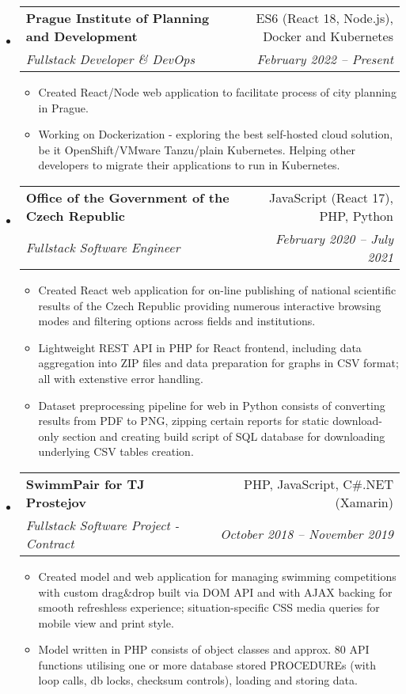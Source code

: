 \documentclass[letterpaper,11pt]{article}
\makeatletter
\newcommand{\sitem}[1]{\item #1 \vspace{-2pt}}
\newcommand{\resumeSubheading}[4]{
  \vspace{-1pt}\item
    \begin{tabular*}{0.97\textwidth}[t]{l@{\extracolsep{\fill}}r}
      \textbf{#1} & #2 \\
      \textit{\small#3} & \textit{\small #4} \\
    \end{tabular*}\vspace{-5pt}
}
\newenvironment{subheadingListing}{\begin{itemize}[leftmargin=*]}{\end{itemize}}
\newenvironment{resumeList}{\begin{itemize}}{\end{itemize}\vspace{-5pt}}
\makeatother
\begin{document}
\begin{subheadingListing}

  \resumeSubheading
  {Prague Institute of Planning and Development}{ES6 (React 18, Node.js), Docker and Kubernetes}
  {Fullstack Developer \& DevOps}{February 2022 – Present}
  \begin{resumeList}
    \sitem{Created React/Node web application to facilitate process of city planning in Prague.}
     \sitem{Working on Dockerization - exploring the best self-hosted cloud solution, be it OpenShift/VMware Tanzu/plain Kubernetes. Helping other developers to migrate their applications to run in Kubernetes.}
  \end{resumeList}

  \resumeSubheading
  {Office of the Government of the Czech Republic}{JavaScript (React 17), PHP, Python}
  {Fullstack Software Engineer}{February 2020 – July 2021}
  \begin{resumeList}
    \sitem{Created React web application for on-line publishing of national scientific results of the Czech Republic providing numerous interactive browsing modes and filtering options across fields and institutions.}
    \sitem{Lightweight REST API in PHP for React frontend, including data aggregation into ZIP files and data preparation for graphs in CSV format; all with extenstive error handling.}
    \sitem{Dataset preprocessing pipeline for web in Python consists of converting results from PDF to PNG, zipping certain reports for static download-only section and creating build script of SQL database for downloading underlying CSV tables creation.}
  \end{resumeList}

  \resumeSubheading
  {SwimmPair for TJ Prostejov}{PHP, JavaScript, C\#.NET (Xamarin)}
  {Fullstack Software Project - Contract}{October 2018 – November 2019}
  \begin{resumeList}
    \sitem{Created model and web application for managing swimming competitions with custom drag\&drop built via DOM API and with AJAX backing for smooth refreshless experience; situation-specific CSS media queries for mobile view and print style.}
    \sitem{Model written in PHP consists of object classes and approx. 80 API functions utilising one or more database stored PROCEDUREs (with loop calls, db locks, checksum controls), loading and storing data.}
  \end{resumeList}


\end{subheadingListing}
\end{document}
